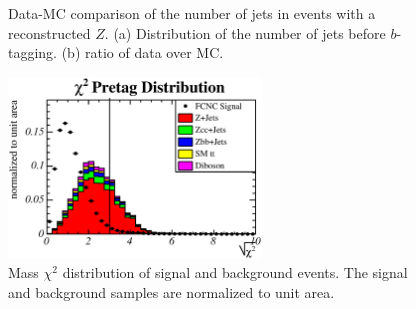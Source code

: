 \begin{figure}[t]
  \begin{center}
  \end{center}
  \caption{Data-MC comparison of the number of jets in events with a
    reconstructed $Z$. (a) Distribution of the number of jets before
    $b$-tagging. (b) ratio of data over MC.}
  \label{fig:alpdata}
\end{figure}

\begin{figure}[t]
  \begin{center}
    \includegraphics[width=0.6\textwidth]{pics/20070525_chi_pre.eps}
  \end{center}
  \caption{Mass $\chi^2$ distribution of signal and background events. The signal and background samples are normalized to unit area.}
  \label{fig:chi2_separation}
\end{figure}


